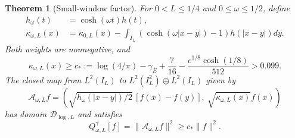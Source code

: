 \documentclass[11pt]{article}
\numberwithin{equation}{section}
\newtheorem{theorem}{Theorem}[section]
\theoremstyle{definition}
\theoremstyle{remark}
\newcommand{\DD}{\mathcal D}
\newcommand{\norm}[1]{\lVert#1\rVert}
\newcommand{\Qgam}{Q^{\gamma}}
\newcommand{\Acal}{\mathcal A}
\begin{document}
\begin{theorem}[Small-window factor]\label{thm:small}
For $0<L\leq1/4$ and $0\leq\omega\leq1/2$, define
\begin{align}
h_\omega(t)&=\cosh(\omega t)h(t),\\
\kappa_{\omega,L}(x)&=\kappa_{0,L}(x)
-\int_{I_L}(\cosh(\omega|x-y|)-1)h(|x-y|)dy.\label{eq:kappashift}
\end{align}
Both weights are nonnegative, and
\begin{equation}
\kappa_{\omega,L}(x)\geq c_*:=
\log(4/\pi)-\gamma_E+\frac7{16}
-\frac{e^{1/8}\cosh(1/8)}{512}>0.099.
\label{eq:cstar}
\end{equation}
The closed map from $L^2(I_L)$ to $L^2(I_L^2)\oplus L^2(I_L)$ given by
\begin{equation}
\Acal_{\omega,L}f=
\left(\sqrt{h_\omega(|x-y|)/2}\,[f(x)-f(y)],
\ \sqrt{\kappa_{\omega,L}(x)}f(x)\right)
\label{eq:smallA}
\end{equation}
has domain $\DD_{\log,L}$ and satisfies
\begin{equation}
\Qgam_{\omega,L}[f]=\norm{\Acal_{\omega,L}f}^2
\geq c_*\norm f^2.
\end{equation}
\end{theorem}
\end{document}
